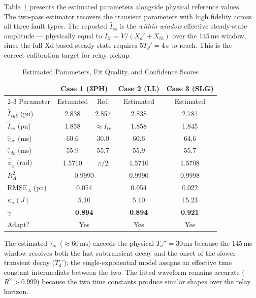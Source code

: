 \documentclass[journal, twoside, 10pt]{IEEEtran}
\begin{document}
Table~\ref{tab:results} presents the estimated parameters alongside physical
reference values.  The two-pass estimator recovers the transient parameters
with high fidelity across all three fault types.  The reported $\hat{I}_{ss}$
is the \emph{within-window} effective steady-state amplitude — physically equal
to $I_{tr} = V/(X_d'+X_{th})$ over the 145\,ms window, since the full
Xd-based steady state requires $5T_d' = 4\,\text{s}$ to reach.  This is the
correct calibration target for relay pickup.

\begin{table}[!t]
\caption{Estimated Parameters, Fit Quality, and Confidence Scores}
\label{tab:results}
\centering
\renewcommand{\arraystretch}{1.15}
\begin{tabular}{@{}lcccc@{}}
\toprule
& \multicolumn{2}{c}{Case 1 (3PH)} & Case 2 (LL) & Case 3 (SLG) \\
\cmidrule(lr){2-3}
Parameter & Estimated & Ref. & Estimated & Estimated \\
\midrule
$\hat{I}_{sub}$ (pu) & 2.838 & 2.857 & 2.838 & 2.781 \\
$\hat{I}_{ss}$ (pu)  & 1.858 & $\approx\!I_{tr}$ & 1.858 & 1.845 \\
$\hat{\tau}_{ac}$ (ms) & 60.6 & 30.0 & 60.6 & 64.6 \\
$\hat{\tau}_{dc}$ (ms) & 55.9 & 55.7 & 55.9 & 55.7 \\
$\hat{\phi}_a$ (rad) & 1.5710 & $\pi/2$ & 1.5710 & 1.5708 \\
\midrule
$R^2_A$          & \multicolumn{2}{c}{0.9990} & 0.9990 & 0.9998 \\
RMSE$_A$ (pu)    & \multicolumn{2}{c}{0.054}  & 0.054  & 0.022  \\
$\kappa_n(J)$    & \multicolumn{2}{c}{5.10}   & 5.10   & 15.23  \\
$\gamma$         & \multicolumn{2}{c}{\textbf{0.894}} & \textbf{0.894} & \textbf{0.921} \\
Adapt?           & \multicolumn{2}{c}{Yes}    & Yes    & Yes    \\
\bottomrule
\end{tabular}
\end{table}

The estimated $\hat{\tau}_{ac}$ ($\approx 60\,\text{ms}$) exceeds the physical
$T_d'' = 30\,\text{ms}$ because the 145\,ms window resolves both the fast
subtransient decay and the onset of the slower transient decay ($T_d'$); the
single-exponential model assigns an effective time constant intermediate
between the two.  The fitted waveform remains accurate ($R^2 > 0.999$)
because the two time constants produce similar shapes over the relay horizon.
\end{document}
